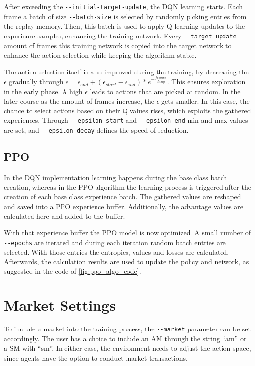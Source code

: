 After exceeding the \verb|--initial-target-update|, the DQN learning starts. Each frame a batch of size \verb|--batch-size| is selected by randomly picking entries from the replay memory. Then, this batch is used to apply Q-learning updates to the experience samples, enhancing the training network. Every \verb|--target-update| amount of frames this training network is copied into the target network to enhance the action selection while keeping the algorithm stable.

The action selection itself is also improved during the training, by decreasing the $\epsilon$ gradually through $\epsilon = \epsilon_{end}+(\epsilon_{start}-\epsilon_{end})*e^{-\frac{frames}{decay}}$. This ensures exploration in the early phase. A high $\epsilon$ leads to actions that are picked at random. In the later course as the amount of frames increase, the $\epsilon$ gets smaller. In this case, the chance to select actions based on their Q values rises, which exploits the gathered experiences. Through \verb|--epsilon-start| and \verb|--epsilon-end| min and max values are set, and \verb|--epsilon-decay| defines the speed of reduction.

\subsection{PPO}
In the DQN implementation learning happens during the base class batch creation, whereas in the PPO algorithm the learning process is triggered after the creation of each base class experience batch. The gathered values are reshaped and saved into a PPO experience buffer. Additionally, the advantage values are calculated here and added to the buffer.

With that experience buffer the PPO model is now optimized. A small number of \verb|--epochs| are iterated and during each iteration random batch entries are selected. With those entries the entropies, values and losses are calculated. Afterwards, the calculation results are used to update the policy and network, as suggested in the code of \ref{fig:ppo_algo_code}.

\section{Market Settings}\label{market_settings}
To include a market into the training process, the \verb|--market| parameter can be set accordingly. The user has a choice to include an AM through the string ``am'' or a SM with ``sm''. In either case, the environment needs to adjust the action space, since agents have the option to conduct market transactions.

